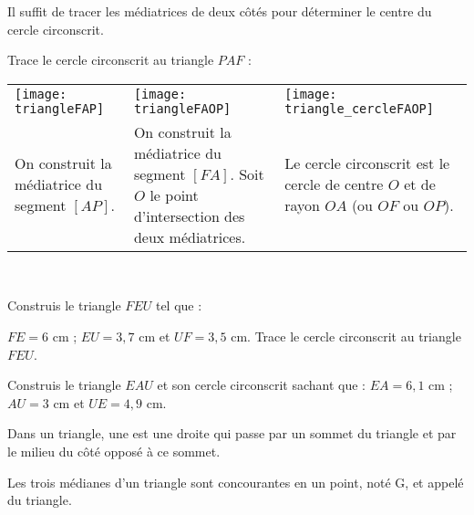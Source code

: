  \begin{methode*1}
 
\begin{remarque}
Il suffit de tracer les médiatrices de deux côtés pour déterminer le centre du cercle circonscrit.
 \end{remarque}
 
 \begin{exemple*1}
Trace le cercle circonscrit au triangle $PAF$ :
 \begin{tabularx}{\textwidth}{X|X|X}
 \texttt{[image: triangleFAP]} &  \texttt{[image: triangleFAOP]} & \texttt{[image: triangle\_cercleFAOP]} \\ 
 On construit la médiatrice du segment $[AP]$. & On construit la médiatrice du segment $[FA]$. Soit $O$ le point d'intersection des deux médiatrices. & Le cercle circonscrit est le cercle de centre $O$ et de rayon $OA$ (ou $OF$ ou $OP$). \\
\end{tabularx} \\

\end{exemple*1}

\exercice
Construis le triangle $FEU$ tel que :

$FE = 6$ cm ; $EU = 3,7$ cm et $UF = 3,5$ cm. Trace le cercle circonscrit au triangle $FEU$.
\vspace{4cm}

\exercice
Construis le triangle $EAU$ et son cercle circonscrit sachant que : $EA = 6,1$ cm ; $AU = 3$ cm et $UE = 4,9$ cm.

\vspace{2cm}

\end{methode*1}





\newpage

\begin{definition}
Dans un triangle, une  est une droite qui passe par un sommet du triangle et par le milieu du côté opposé à ce sommet.

Les trois médianes d'un triangle sont concourantes en un point, noté G, et appelé  du triangle.
\end{definition}

